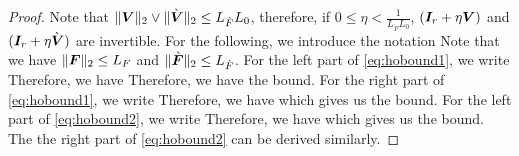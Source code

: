 \begin{proof}
Note that $\lVert\boldsymbol{V}\rVert_2  \vee \lVert\grave{\boldsymbol{V}}\rVert_2 \leq  L_{\grave{F}}  L_0$,  therefore,  if   $0 \leq \eta < \frac{1}{L_{\grave{F}} L_0}$,  $(\boldsymbol{I}_r + \eta  \boldsymbol{V})$ and   $(\boldsymbol{I}_r + \eta  \grave{\boldsymbol{V}})$ are invertible.   For the following, we introduce the notation
Note that we have $\lVert  \boldsymbol{F} \rVert_2 \leq     L_F$   and  $ \lVert  \grave{\boldsymbol{F}} \rVert_2 \leq     L_{\grave{F}}$.  For the left  part of   \eqref{eq:hobound1}, we write
Therefore, we have
Therefore, we have the  bound.  For the right  part of   \eqref{eq:hobound1}, we write
Therefore, we have
which gives us the bound.  For  the left  part of   \eqref{eq:hobound2}, we write
 Therefore, we have
which gives us the  bound.  The  the right  part of   \eqref{eq:hobound2} can be derived similarly. 
\end{proof}
 
